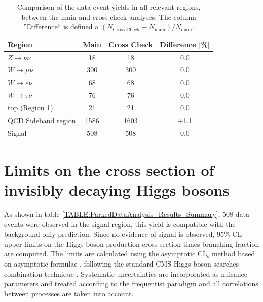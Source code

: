 \begin{table}[!htb]
\centering
\begin{tabular}{|l|c|c|c|}
\hline
Region                & Main & Cross Check & Difference [\%] \\
\hline\hline
$Z\rightarrow\nu\nu$  &   18 &          18 &             0.0 \\
$W\rightarrow\mu\nu$  &  300 &         300 &             0.0 \\
$W\rightarrow e\nu$   &   68 &          68 &             0.0 \\
$W\rightarrow\tau\nu$ &   76 &          76 &             0.0 \\
top (Region 1)        &   21 &          21 &             0.0 \\
QCD Sideband region   & 1586 &        1603 &            +1.1 \\
\hline\hline
Signal                &  508 &         508 &             0.0 \\
\hline
\end{tabular}
\caption[Comparison of the data event yields in all relevant regions, between the main and cross check analyses.]
{Comparison of the data event yields in all relevant regions, between the main and cross check analyses. The column ''Difference`` is defined a $(N_{\text{Cross Check}}-N_{\text{main}})/N_{\text{main}}$.}
\label{TABLE:ParkedDataAnalysis_Results_MainCrossCheckComparison}
\end{table}

\section{Limits on the cross section of invisibly decaying Higgs bosons}
\label{SECTION:ParkedDataAnalysis_Limits}


As shown in table \ref{TABLE:ParkedDataAnalysis_Results_Summary}, 508 data events were observed in the signal region, this yield is compatible with the background-only prediction. Since no evidence of signal is observed, 95\% \gls{CL} upper limits on the Higgs boson production cross section times branching fraction are computed. The limits are calculated using the asymptotic $\mathrm{CL}_\mathrm{s}$ method \cite{ARTICLE:CLsTechnique,ARTICLE:CLCompForCombiningSearchesWithSmallStat,ARTICLE:HandbookofLHCHiggsCrossSectionsDifferentialDistributions} based on asymptotic formulae \cite{ARTICLE:AsymptoticCLS}, following the standard \gls{CMS} Higgs boson searches combination technique \cite{ARTICLE:CMS_HiggsDiscovery,ARTICLE:HiggsCombination}. Systematic uncertainties are incorporated as nuisance parameters and treated according to the frequentist paradigm \cite{ARTICLE:HiggsCombination} and all correlations between processes are taken into account.

